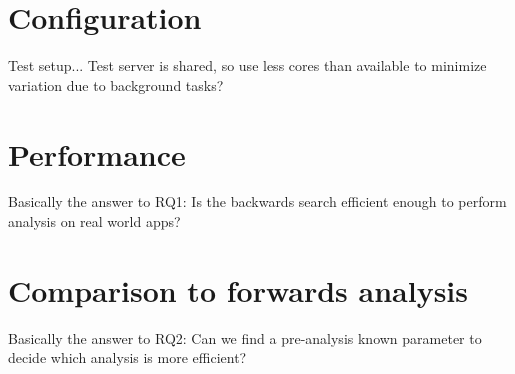 \documentclass[../draft.tex]{subfiles}
\begin{document}
    \section{Configuration}
    Test setup...
    Test server is shared, so use less cores than available to minimize variation due to background tasks?

    \section{Performance}
    Basically the answer to RQ1: Is the backwards search efficient enough to perform analysis on real world apps?

    \section{Comparison to forwards analysis}
    Basically the answer to RQ2: Can we find a pre-analysis known parameter to decide which analysis is more efficient?
\end{document}
